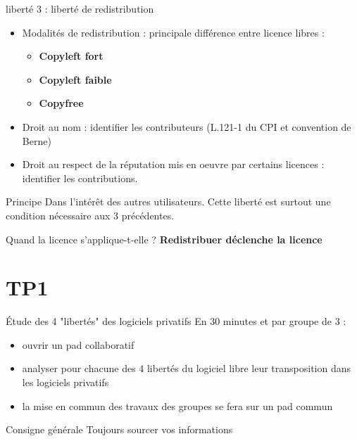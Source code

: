 \documentclass{beamer}
\begin{document}
\begin{frame}{liberté 3 : liberté de redistribution}
  \begin{itemize}
  \item Modalités de redistribution : principale différence entre licence libres :
    \begin{itemize}
    \item \textbf{Copyleft fort}
    \item \textbf{Copyleft faible}
    \item \textbf{Copyfree}
    \end{itemize}
  \item Droit au nom : identifier les contributeurs (L.121-1 du CPI et convention de Berne)
  \item Droit au respect de la réputation mis en oeuvre par certains licences : identifier les contributions.
  \end{itemize}
\begin{alertblock}{Principe}
    Dans l'intérêt des autres utilisateurs. Cette liberté est surtout une condition nécessaire aux 3 précédentes.
  \end{alertblock}

\begin{alertblock}{Quand la licence s'applique-t-elle ?}
\textbf{Redistribuer déclenche la licence}
 \end{alertblock}
\end{frame}

\section{TP1}

\begin{frame}{Étude des 4 "libertés" des logiciels privatifs}
  En 30 minutes et par groupe de 3 :
  \begin{itemize}
  \item ouvrir un pad collaboratif
  \item analyser pour chacune des 4 libertés du logiciel libre leur transposition dans les logiciels privatifs
  \item la mise en commun des travaux des groupes se fera sur un pad commun
  \end{itemize}

  \begin{alertblock}{Consigne générale}
    Toujours sourcer vos informations    
  \end{alertblock}
\end{frame}
\end{document}
